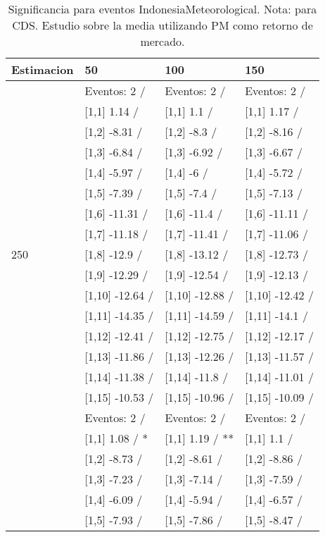 \begin{table}

\caption{Significancia para eventos IndonesiaMeteorological. Nota: para CDS. Estudio sobre la media utilizando PM como retorno de mercado.}
\centering
\begin{tabular}[t]{llll}
\toprule
Estimacion & 50 & 100 & 150\\
\midrule
 & Eventos:  2 / & Eventos:  2 / & Eventos:  2 /\\
 & {}[1,1] 1.14  / & {}[1,1] 1.1  / & {}[1,1] 1.17  /\\
 & {}[1,2] -8.31  / & {}[1,2] -8.3  / & {}[1,2] -8.16  /\\
 & {}[1,3] -6.84  / & {}[1,3] -6.92  / & {}[1,3] -6.67  /\\
 & {}[1,4] -5.97  / & {}[1,4] -6  / & {}[1,4] -5.72  /\\
\addlinespace
 & {}[1,5] -7.39  / & {}[1,5] -7.4  / & {}[1,5] -7.13  /\\
 & {}[1,6] -11.31  / & {}[1,6] -11.4  / & {}[1,6] -11.11  /\\
 & {}[1,7] -11.18  / & {}[1,7] -11.41  / & {}[1,7] -11.06  /\\
250 & {}[1,8] -12.9  / & {}[1,8] -13.12  / & {}[1,8] -12.73  /\\
 & {}[1,9] -12.29  / & {}[1,9] -12.54  / & {}[1,9] -12.13  /\\
\addlinespace
 & {}[1,10] -12.64  / & {}[1,10] -12.88  / & {}[1,10] -12.42  /\\
 & {}[1,11] -14.35  / & {}[1,11] -14.59  / & {}[1,11] -14.1  /\\
 & {}[1,12] -12.41  / & {}[1,12] -12.75  / & {}[1,12] -12.17  /\\
 & {}[1,13] -11.86  / & {}[1,13] -12.26  / & {}[1,13] -11.57  /\\
 & {}[1,14] -11.38  / & {}[1,14] -11.8  / & {}[1,14] -11.01  /\\
\addlinespace
 & {}[1,15] -10.53  / & {}[1,15] -10.96  / & {}[1,15] -10.09  /\\
 & Eventos:  2 / & Eventos:  2 / & Eventos:  2 /\\
 & {}[1,1] 1.08  / * & {}[1,1] 1.19  / ** & {}[1,1] 1.1  /\\
 & {}[1,2] -8.73  / & {}[1,2] -8.61  / & {}[1,2] -8.86  /\\
 & {}[1,3] -7.23  / & {}[1,3] -7.14  / & {}[1,3] -7.59  /\\
\addlinespace
 & {}[1,4] -6.09  / & {}[1,4] -5.94  / & {}[1,4] -6.57  /\\
 & {}[1,5] -7.93  / & {}[1,5] -7.86  / & {}[1,5] -8.47  /\\

\end{tabular}
\end{table}
